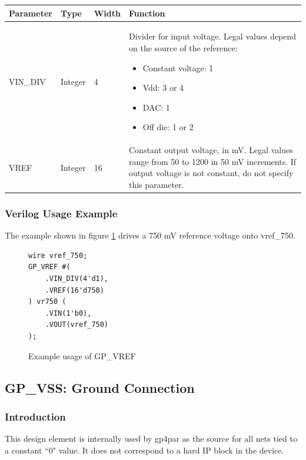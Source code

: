 \documentclass{article}
\begin{document}
\begin{tabularx}{5in}{|l|l|l|X|}
\hline
{\bfseries Parameter} & {\bfseries Type} & {\bfseries Width} & {\bfseries Function} \\
\hline
VIN\_DIV & Integer & 4 &
	Divider for input voltage. Legal values depend on the source of the reference:
	\begin{itemize}
		\item Constant voltage: 1
		\item Vdd: 3 or 4
		\item DAC: 1
		\item Off die: 1 or 2
	\end{itemize}
\\
\hline 
VREF & Integer & 16 &
	Constant output voltage, in mV. Legal values range from 50 to 1200 in 50 mV increments.
	If output voltage is not constant, do not specify this parameter.\\
\hline
\end{tabularx}

\pagebreak
\subsubsection{Verilog Usage Example}

The example shown in figure \ref{gp-vref-example} drives a 750 mV reference voltage onto vref\_750.

\begin{figure}[h]
\begin{lstlisting}
wire vref_750;
GP_VREF #(
	.VIN_DIV(4'd1),
	.VREF(16'd750)
) vr750 (
	.VIN(1'b0),
	.VOUT(vref_750)
);
\end{lstlisting}
\caption{Example usage of GP\_VREF}
\label{gp-vref-example}
\end{figure}


\clearpage
\pagebreak
\subsection{GP\_VSS: Ground Connection}

\subsubsection{Introduction}
This design element is internally used by gp4par as the source for all nets tied to a constant ``0" value. It does not 
correspond to a hard IP block in the device.
\end{document}
